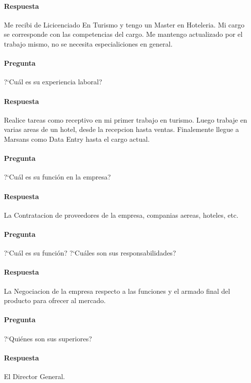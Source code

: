 \documentclass[12pt,a4paper,spanish]{article}
\begin{document}
	\paragraph{Respuesta}
Me recibi de Licicenciado En Turismo y tengo un Master en Hoteleria.
Mi cargo se corresponde con las competencias del cargo.
Me mantengo actualizado por el trabajo mismo, no se necesita especialiciones en general.

	\paragraph{Pregunta}
	 ?`Cu\'al es su experiencia laboral?
	\paragraph{Respuesta}
Realice tareas como receptivo en mi primer trabajo en turismo.
Luego trabaje en varias areas de un hotel, desde la recepcion hasta ventas.
Finalemente llegue a Marsans como Data Entry hasta el cargo actual.

	\paragraph{Pregunta}
	 ?`Cu\'al es su funci\'on en la empresa?
	\paragraph{Respuesta}
La Contratacion de proveedores de la empresa, companias aereas, hoteles, etc.
	
	\paragraph{Pregunta}
	 ?`Cu\'al es su funci\'on?  ?`Cu\'ales son sus responsabilidades?
	\paragraph{Respuesta}
La Negociacion de la empresa respecto a las funciones y el armado final del producto para ofrecer al mercado.

	\paragraph{Pregunta}
	 ?`Qui\'enes son sus superiores? 
	\paragraph{Respuesta}
El Director General.
\end{document}
